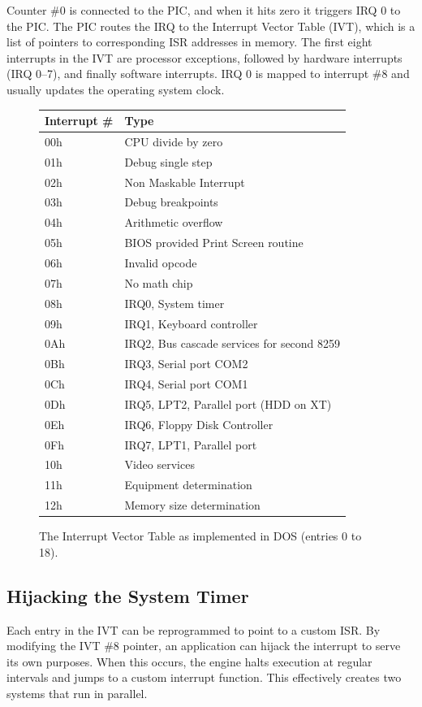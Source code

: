 \documentclass[book.tex]{subfiles}
\begin{document}
\par
Counter \#0 is connected to the PIC, and when it hits zero it triggers IRQ 0 to the PIC. The PIC routes the IRQ to the Interrupt Vector Table (IVT), which is a list of pointers to corresponding ISR addresses in memory. The first eight interrupts in the IVT are processor exceptions, followed by hardware interrupts (IRQ 0--7), and finally software interrupts. IRQ 0 is mapped to interrupt \#8 and usually updates the operating system clock.

\begin{figure}[H]
	\renewcommand{\arraystretch}{1.1}
	\centering
	\begin{tabularx}{\textwidth}{ l p{}  }
	  \toprule
	  \textbf{Interrupt \#} & \textbf{Type} \\ \bottomrule

	  00h	&	CPU divide by zero \\
01h	&	Debug single step \\
02h	&	Non Maskable Interrupt \\
03h	&	Debug breakpoints \\
04h	&	Arithmetic overflow \\
05h	&	BIOS provided Print Screen routine \\
06h	&	Invalid opcode \\
07h	&	No math chip \\
08h & IRQ0, System timer \\
09h & IRQ1, Keyboard controller \\
0Ah & IRQ2, Bus cascade services for second 8259 \\
0Bh & IRQ3, Serial port COM2 \\ 
0Ch & IRQ4, Serial port COM1 \\
0Dh & IRQ5, LPT2, Parallel port (HDD on XT) \\
0Eh & IRQ6, Floppy Disk Controller \\
0Fh & IRQ7, LPT1, Parallel port \\
10h & Video services\\
11h & Equipment determination \\
12h & Memory size determination \\
		\bottomrule
	\end{tabularx}
	\caption{The Interrupt Vector Table as implemented in DOS (entries 0 to 18).}
\end{figure}

\subsection{Hijacking the System Timer}
Each entry in the IVT can be reprogrammed to point to a custom ISR. By modifying the IVT \#8 pointer, an application can hijack the interrupt to serve its own purposes. When this occurs, the engine halts execution at regular intervals and jumps to a custom interrupt function. This effectively creates two systems that run in parallel.\\
\end{document}
